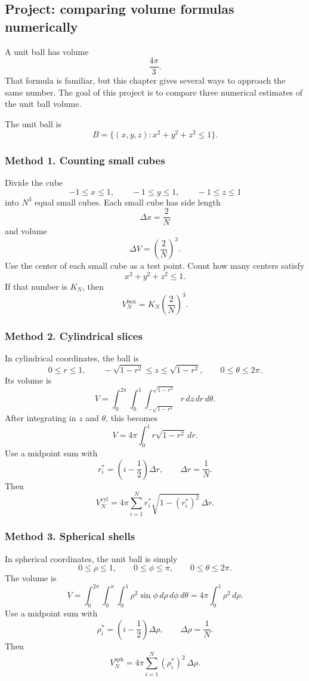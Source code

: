 \subsection{Project: comparing volume formulas numerically}

A unit ball has volume
\[
    \frac{4\pi}{3}.
\]
That formula is familiar, but this chapter gives several ways to approach the same
number.  The goal of this project is to compare three numerical estimates of the unit
ball volume.

The unit ball is
\[
    B=\{(x,y,z):x^2+y^2+z^2\le1\}.
\]

\subsubsection*{Method 1. Counting small cubes}

Divide the cube
\[
    -1\le x\le1,\qquad -1\le y\le1,\qquad -1\le z\le1
\]
into \(N^3\) equal small cubes.  Each small cube has side length
\[
    \Delta x=\frac{2}{N}
\]
and volume
\[
    \Delta V=\left(\frac{2}{N}\right)^3.
\]
Use the center of each small cube as a test point.  Count how many centers satisfy
\[
    x^2+y^2+z^2\le1.
\]
If that number is \(K_N\), then
\[
\boxed{
    V_N^{\mathrm{box}}
    =
    K_N\left(\frac{2}{N}\right)^3.
}
\]

\subsubsection*{Method 2. Cylindrical slices}

In cylindrical coordinates, the ball is
\[
    0\le r\le1,
    \qquad
    -\sqrt{1-r^2}\le z\le \sqrt{1-r^2},
    \qquad
    0\le\theta\le2\pi.
\]
Its volume is
\[
    V=
    \int_0^{2\pi}\int_0^1\int_{-\sqrt{1-r^2}}^{\sqrt{1-r^2}}
    r\,dz\,dr\,d\theta.
\]
After integrating in \(z\) and \(\theta\), this becomes
\[
    V=4\pi\int_0^1 r\sqrt{1-r^2}\,dr.
\]
Use a midpoint sum with
\[
    r_i^*=\left(i-\frac12\right)\Delta r,
    \qquad
    \Delta r=\frac1N.
\]
Then
\[
\boxed{
    V_N^{\mathrm{cyl}}
    =
    4\pi\sum_{i=1}^N
    r_i^*\sqrt{1-(r_i^*)^2}\,\Delta r.
}
\]

\subsubsection*{Method 3. Spherical shells}

In spherical coordinates, the unit ball is simply
\[
    0\le\rho\le1,\qquad 0\le\phi\le\pi,\qquad 0\le\theta\le2\pi.
\]
The volume is
\[
    V=
    \int_0^{2\pi}\int_0^\pi\int_0^1
    \rho^2\sin\phi\,d\rho\,d\phi\,d\theta
    =
    4\pi\int_0^1\rho^2\,d\rho.
\]
Use a midpoint sum with
\[
    \rho_i^*=\left(i-\frac12\right)\Delta\rho,
    \qquad
    \Delta\rho=\frac1N.
\]
Then
\[
\boxed{
    V_N^{\mathrm{sph}}
    =
    4\pi\sum_{i=1}^N
    (\rho_i^*)^2\,\Delta\rho.
}
\]

